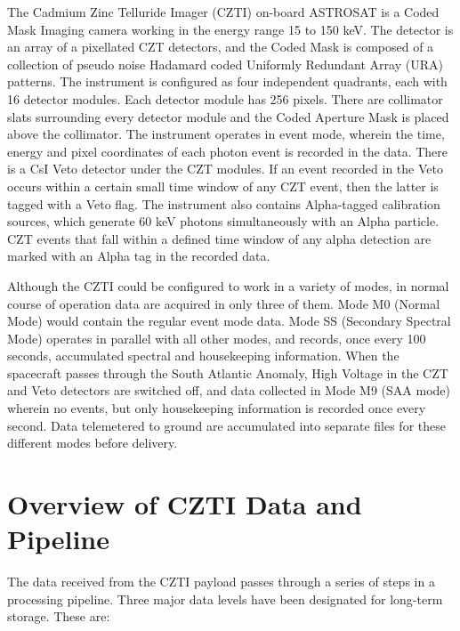 \documentclass[11pt,oneside,a4paper]{article}
\begin{document}


The Cadmium  Zinc Telluride Imager  (CZTI)  on-board  ASTROSAT  is a Coded Mask Imaging 
camera working in the energy range 15 to 150 keV.  The detector is an array of a pixellated CZT  
detectors, and the Coded Mask is composed of a collection of pseudo noise Hadamard coded 
Uniformly Redundant Array (URA) patterns.   The instrument  is  configured  as   four   independent 
quadrants,  each  with 16  detector modules.   Each detector module has 256 pixels. There  are 
collimator  slats   surrounding  every  detector  module  and   the   Coded   Aperture  Mask  is  placed  
above   the   collimator.  The instrument operates in event mode, wherein the time, energy and
pixel coordinates of each photon event is recorded in the data.  There is a CsI Veto detector under 
the CZT modules.  If an event recorded in the Veto occurs within a certain small time window of 
any CZT event, then the latter is tagged with a Veto flag.  The instrument also contains Alpha-tagged 
calibration sources, which generate 60 keV photons simultaneously with an Alpha particle.  CZT 
events that fall within a defined time window of any alpha detection are marked with an Alpha tag
in the recorded data.

Although the CZTI could be configured to work in a variety of modes, in normal course of operation
data are acquired in only three of them.  Mode M0 (Normal Mode) would contain the regular event 
mode data. Mode SS (Secondary Spectral Mode) operates in parallel with all other modes, and 
records, once every 100 seconds, accumulated spectral and housekeeping information.  When the
spacecraft passes through the South Atlantic Anomaly, High Voltage in the CZT and Veto detectors
are switched off, and data collected in Mode M9 (SAA mode) wherein no events, but only housekeeping information is recorded once every second.  Data telemetered to ground are accumulated into separate
files for these different modes before delivery.

\section{Overview of CZTI Data and Pipeline}

The  data    received    from    the     CZTI    payload   passes   through     a   series  of  steps   in  a 
processing   pipeline.   Three   major   data    levels  have    been    designated  for     long-term 
storage. These   are:
\end{document}
